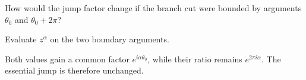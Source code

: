 \begin{exercise}\label{exr:iv21-expand-16}
How would the jump factor change if the branch cut were bounded by arguments \(\theta_0\) and \(\theta_0+2\pi\)?
\end{exercise}
\begin{hint}
Evaluate \(z^\alpha\) on the two boundary arguments.
\end{hint}
\begin{solution}
Both values gain a common factor \(e^{i\alpha\theta_0}\), while their ratio remains \(e^{2\pi i\alpha}\). The essential jump is therefore unchanged.
\end{solution}

